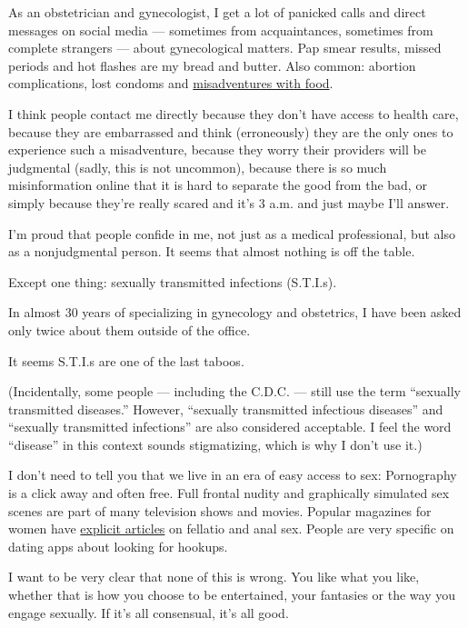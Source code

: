 As an obstetrician and gynecologist, I get a lot of panicked calls and
direct messages on social media --- sometimes from acquaintances,
sometimes from complete strangers --- about gynecological matters. Pap
smear results, missed periods and hot flashes are my bread and butter.
Also common: abortion complications, lost condoms and
\href{https://www.nytimes3xbfgragh.onion/2018/06/11/style/dont-put-this-up-there.html}{misadventures
with food}.

I think people contact me directly because they don't have access to
health care, because they are embarrassed and think (erroneously) they
are the only ones to experience such a misadventure, because they worry
their providers will be judgmental (sadly, this is not uncommon),
because there is so much misinformation online that it is hard to
separate the good from the bad, or simply because they're really scared
and it's 3 a.m. and just maybe I'll answer.

I'm proud that people confide in me, not just as a medical professional,
but also as a nonjudgmental person. It seems that almost nothing is off
the table.

Except one thing: sexually transmitted infections (S.T.I.s).

In almost 30 years of specializing in gynecology and obstetrics, I have
been asked only twice about them outside of the office.

It seems S.T.I.s are one of the last taboos.

(Incidentally, some people --- including the C.D.C. --- still use the
term ``sexually transmitted diseases.'' However, ``sexually transmitted
infectious diseases'' and ``sexually transmitted infections'' are also
considered acceptable. I feel the word ``disease'' in this context
sounds stigmatizing, which is why I don't use it.)

I don't need to tell you that we live in an era of easy access to sex:
Pornography is a click away and often free. Full frontal nudity and
graphically simulated sex scenes are part of many television shows and
movies. Popular magazines for women have
\href{https://www.cosmopolitan.com/sex-love/advice/a6676/anal-sex-beginners-guide/}{explicit
articles} on fellatio and anal sex. People are very specific on dating
apps about looking for hookups.

I want to be very clear that none of this is wrong. You like what you
like, whether that is how you choose to be entertained, your fantasies
or the way you engage sexually. If it's all consensual, it's all good.

